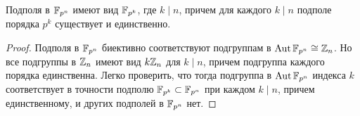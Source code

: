 \begin{corollary}
	Подполя в $\mathbb{F}_{p^n}$ имеют вид $\mathbb{F}_{p^k}$, где $k \mid n$, причем для каждого $k \mid n$ подполе порядка $p^k$ существует и единственно.
\end{corollary}

\begin{proof}
	Подполя в $\mathbb{F}_{p^n}$ биективно соответствуют подгруппам в $\operatorname{Aut}\mathbb{F}_{p^n} \cong \mathbb{Z}_n$. Но все подгруппы в $\mathbb{Z}_n$ имеют вид $k\mathbb{Z}_n$ для $k \mid n$, причем подгруппа каждого порядка единственна. Легко проверить, что тогда подгруппа в $\operatorname{Aut}\mathbb{F}_{p^n}$ индекса $k$ соответствует в точности подполю $\mathbb{F}_{p^k} \subset \mathbb{F}_{p^n}$ при каждом $k \mid n$, причем единственному, и других подполей в $\mathbb{F}_{p^n}$ нет.
\end{proof}
